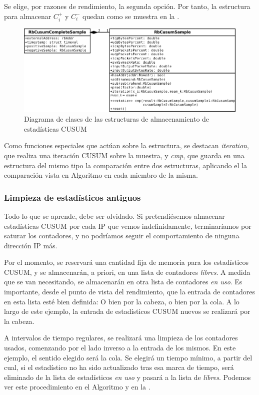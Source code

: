 Se elige, por razones de rendimiento, la segunda opción. Por tanto, la estructura para almacenar $C_i^+$ y $C_i^-$ 
quedan como se muestra en la .

\begin{figure}[htbp]
\centering
\includegraphics[width=\textwidth]{CapituloEstructura/Figuras/DiagramaClasesCusumSample-crop}
\caption{Diagrama de clases de las estructuras de almacenamiento de estadísticas CUSUM}
\end{figure}
%

Como funciones especiales que actúan sobre la estructura, se destacan \emph{iteration}, que realiza una iteración 
\gls{CUSUM} sobre la muestra, y \emph{cmp}, que guarda en una estructura del mismo tipo la comparación entre dos 
estructuras, aplicando el la comparación vista en Algoritmo en cada miembro de la misma.

\subsubsection{Limpieza de estadísticos antiguos}
Todo lo que se aprende, debe ser olvidado. Si pretendiésemos almacenar estadísticas \gls{CUSUM} por cada \gls{IP} que 
vemos indefinidamente, terminaríamos por saturar los contadores, y no podríamos seguir el comportamiento de ninguna 
dirección \gls{IP} más.

Por el momento, se reservará una cantidad fija de memoria para los estadísticos \gls{CUSUM}, y se almacenarán, a 
priori, en una lista de contadores \emph{libres}. A medida que se van necesitando, se almacenarán en otra lista de 
contadores \emph{en uso}. Es importante, desde el punto de vista del rendimiento, que la entrada de contadores en esta 
lista esté bien definida: O bien por la cabeza, o bien por la cola. A lo largo de este ejemplo, la entrada de 
estadísticos \gls{CUSUM} nuevos se realizará por la cabeza.

A intervalos de tiempo regulares, se realizará una limpieza de los contadores usados, comenzando por el lado inverso a 
la entrada de los mismos. En este ejemplo, el sentido elegido será la cola. Se elegirá un tiempo mínimo, a partir del 
cual, si el estadístico no ha sido actualizado tras esa marca de tiempo, será eliminado de la lista de 
estadísticos \emph{en uso} y pasará a la lista de \emph{libres}. Podemos ver este procedimiento en el 
Algoritmo y en la .

